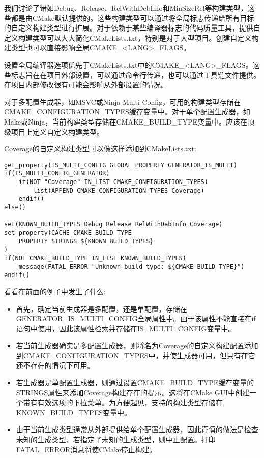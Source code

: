
我们讨论了诸如Debug、Release、RelWithDebInfo和MinSizeRel等构建类型，这些都是由CMake默认提供的。这些构建类型可以通过将全局标志传递给所有目标的自定义构建类型进行扩展。对于依赖于某些编译器标志的代码质量工具，提供自定义构建类型可以大大简化CMakeLists.txt，特别是对于大型项目。创建自定义构建类型也可以直接影响全局CMAKE\_<LANG>\_FLAGS。

\begin{tcolorbox}[colback=blue!5!white,colframe=blue!75!black,title=别覆盖CMAKE\_<LANG>\_FLAGS]
设置全局编译器选项优先于CMakeLists.txt中的CMAKE\_<LANG>\_FLAGS。这些标志旨在在项目外部设置，可以通过命令行传递，也可以通过工具链文件提供。在项目内部修改很有可能会影响从外部设置的情况。
\end{tcolorbox}

对于多配置生成器，如MSVC或Ninja Multi-Config，可用的构建类型存储在CMAKE\_CONFIGURATION\_TYPES缓存变量中。对于单个配置生成器，如Make或Ninja，当前构建类型存储在CMAKE\_BUILD\_TYPE变量中。应该在顶级项目上定义自定义构建类型。

Coverage的自定义构建类型可以像这样添加到CMakeLists.txt:

\begin{lstlisting}[style=styleCMake]
get_property(IS_MULTI_CONFIG GLOBAL PROPERTY GENERATOR_IS_MULTI)
if(IS_MULTI_CONFIG_GENERATOR)
	if(NOT "Coverage" IN_LIST CMAKE_CONFIGURATION_TYPES)
		list(APPEND CMAKE_CONFIGURATION_TYPES Coverage)
	endif()
else()

set(KNOWN_BUILD_TYPES Debug Release RelWithDebInfo Coverage)
set_property(CACHE CMAKE_BUILD_TYPE
	PROPERTY STRINGS ${KNOWN_BUILD_TYPES}
)
if(NOT CMAKE_BUILD_TYPE IN_LIST KNOWN_BUILD_TYPES)
	message(FATAL_ERROR "Unknown build type: ${CMAKE_BUILD_TYPE}")
endif()
\end{lstlisting}

看看在前面的例子中发生了什么:

\begin{itemize}
\item 
首先，确定当前生成器是多配置，还是单配置，存储在GENERATOR\_IS\_MULTI\_CONFIG全局属性中。由于该属性不能直接在if语句中使用，因此该属性检索并存储在IS\_MULTI\_CONFIG变量中。

\item 
若当前生成器确实是多配置生成器，则将名为Coverage的自定义构建配置添加到CMAKE\_CONFIGURATION\_TYPES中，并使生成器可用，但只有在它还不存在的情况下可用。

\item 
若生成器是单配置生成器，则通过设置CMAKE\_BUILD\_TYPE缓存变量的STRINGS属性来添加Coverage构建存在的提示。这将在CMake GUI中创建一个带有有效选项的下拉菜单。为方便起见，支持的构建类型存储在KNOWN\_BUILD\_TYPES变量中。

\item 
由于当前生成类型通常从外部提供给单个配置生成器，因此谨慎的做法是检查未知的生成类型，若指定了未知的生成类型，则中止配置。打印FATAL\_ERROR消息将使CMake停止构建。
\end{itemize}

